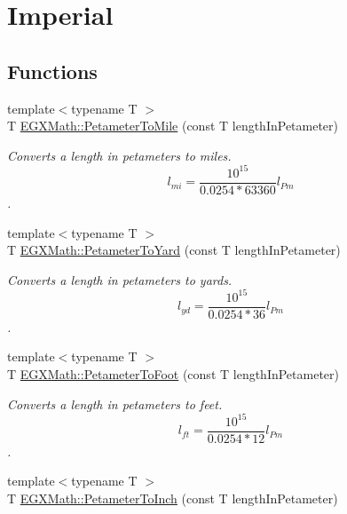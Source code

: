 \hypertarget{group___e_g_x_math-_conversions-_length_conversions-_s_i-_petameter-_imperial}{}\section{Imperial}
\label{group___e_g_x_math-_conversions-_length_conversions-_s_i-_petameter-_imperial}
\subsection*{Functions}
\begin{DoxyCompactItemize}
\item 
{\footnotesize template$<$typename T $>$ }\\T \mbox{\hyperlink{group___e_g_x_math-_conversions-_length_conversions-_s_i-_petameter-_imperial_ga3aa40ba19c1425ed3473c605cf7d4478}{E\+G\+X\+Math\+::\+Petameter\+To\+Mile}} (const T length\+In\+Petameter)
\begin{DoxyCompactList}\small\item\em Converts a length in petameters to miles. \[ l_{mi}=\frac{10^{15}}{0.0254 * 63360} l_{Pm} \]. \end{DoxyCompactList}\item 
{\footnotesize template$<$typename T $>$ }\\T \mbox{\hyperlink{group___e_g_x_math-_conversions-_length_conversions-_s_i-_petameter-_imperial_gadd453d20eef89db280c71397046d5dcd}{E\+G\+X\+Math\+::\+Petameter\+To\+Yard}} (const T length\+In\+Petameter)
\begin{DoxyCompactList}\small\item\em Converts a length in petameters to yards. \[ l_{yd}= \frac{10^{15}}{0.0254 * 36} l_{Pm} \]. \end{DoxyCompactList}\item 
{\footnotesize template$<$typename T $>$ }\\T \mbox{\hyperlink{group___e_g_x_math-_conversions-_length_conversions-_s_i-_petameter-_imperial_gab1b79668a9de6a8374601bb44dde250d}{E\+G\+X\+Math\+::\+Petameter\+To\+Foot}} (const T length\+In\+Petameter)
\begin{DoxyCompactList}\small\item\em Converts a length in petameters to feet. \[ l_{ft}= \frac{10^{15}}{0.0254 * 12} l_{Pm} \]. \end{DoxyCompactList}\item 
{\footnotesize template$<$typename T $>$ }\\T \mbox{\hyperlink{group___e_g_x_math-_conversions-_length_conversions-_s_i-_petameter-_imperial_ga8e0128613c738b54c64e5bdd37f41b5b}{E\+G\+X\+Math\+::\+Petameter\+To\+Inch}} (const T length\+In\+Petameter)

\end{DoxyCompactItemize}
